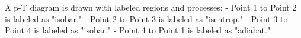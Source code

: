 A p-T diagram is drawn with labeled regions and processes:  
- Point 1 to Point 2 is labeled as "isobar."  
- Point 2 to Point 3 is labeled as "isentrop."  
- Point 3 to Point 4 is labeled as "isobar."  
- Point 4 to Point 1 is labeled as "adiabat."